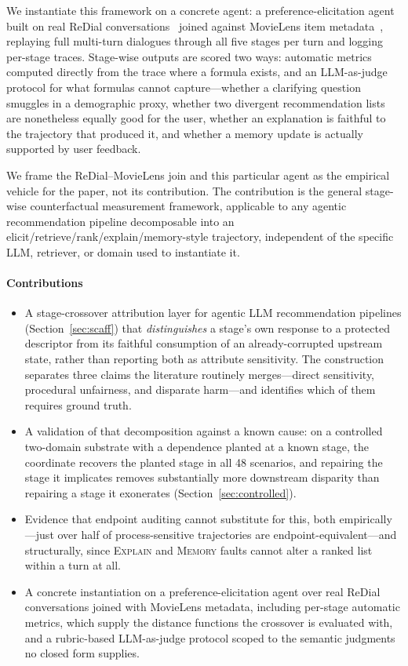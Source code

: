 \documentclass[manuscript,screen,review]{acmart}
\newcommand{\stage}[1]{\textsc{#1}}
\begin{document}
We instantiate this framework on a concrete agent: a preference-elicitation agent
built on real ReDial conversations~\cite{li2018redial} joined against MovieLens
item metadata~\cite{harper2015movielens}, replaying full multi-turn dialogues
through all five stages per turn and logging per-stage traces. Stage-wise outputs
are scored two ways: automatic metrics computed directly from the trace where a
formula exists, and an LLM-as-judge protocol for what formulas cannot
capture---whether a clarifying question smuggles in a demographic proxy, whether
two divergent recommendation lists are nonetheless equally good for the user,
whether an explanation is faithful to the trajectory that produced it, and
whether a memory update is actually supported by user feedback.

We frame the ReDial--MovieLens join and this particular agent as the empirical
vehicle for the paper, not its contribution. The contribution is the general
stage-wise counterfactual measurement framework, applicable to any agentic
recommendation pipeline decomposable into an
elicit/retrieve/rank/explain/memory-style trajectory, independent of the specific
LLM, retriever, or domain used to instantiate it.

\paragraph{Contributions}
\begin{itemize}
  \item A stage-crossover attribution layer for agentic LLM recommendation
    pipelines (Section~\ref{sec:scaff}) that \emph{distinguishes} a stage's own
    response to a protected descriptor from its faithful consumption of an
    already-corrupted upstream state, rather than reporting both as
    attribute sensitivity. The construction separates three claims the
    literature routinely merges---direct sensitivity, procedural unfairness, and
    disparate harm---and identifies which of them requires ground truth.
  \item A validation of that decomposition against a known cause: on a
    controlled two-domain substrate with a dependence planted at a known stage,
    the coordinate recovers the planted stage in all 48 scenarios, and repairing
    the stage it implicates removes substantially more downstream disparity than
    repairing a stage it exonerates (Section~\ref{sec:controlled}).
  \item Evidence that endpoint auditing cannot substitute for this, both
    empirically---just over half of process-sensitive trajectories are
    endpoint-equivalent---and structurally, since \stage{Explain} and
    \stage{Memory} faults cannot alter a ranked list within a turn at all.
  \item A concrete instantiation on a preference-elicitation agent over real
    ReDial conversations joined with MovieLens metadata, including per-stage
    automatic metrics, which supply the distance functions the crossover is
    evaluated with, and a rubric-based LLM-as-judge protocol scoped to the
    semantic judgments no closed form supplies.
\end{itemize}
\end{document}
